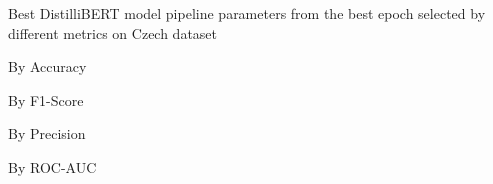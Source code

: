 \begin{table}[!htbp]
    \caption{Best DistilliBERT model pipeline parameters from the best epoch selected by different metrics on Czech dataset}
    \label{tab:czech_distillibert_pipeline_params}
    \centering

    \begin{subtable}[t]{0.48\linewidth}
        \scriptsize
        \caption{By Accuracy}
        
    \end{subtable}
    \hfill
    \begin{subtable}[t]{0.48\linewidth}
        \scriptsize
        \caption{By F1-Score}
        
    \end{subtable}

    \vspace{1em}

    \begin{subtable}[t]{0.48\linewidth}
        \scriptsize
        \caption{By Precision}
        
    \end{subtable}
    \hfill
    \begin{subtable}[t]{0.48\linewidth}
        \scriptsize
        \caption{By ROC-AUC}
        
    \end{subtable}

\end{table}